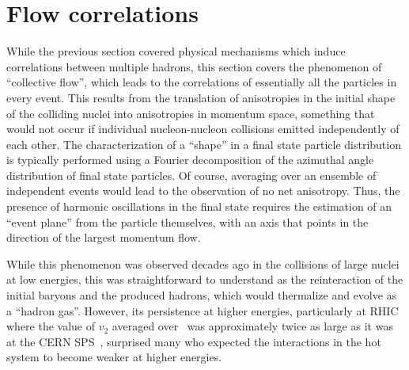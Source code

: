 \section{Flow correlations}
\label{sec:ps:flow}


While the previous section covered physical mechanisms which induce
correlations between multiple hadrons, this section covers the
phenomenon of ``collective flow'', which leads to the correlations of
essentially all the particles in every event.
This results from the translation of anisotropies in the initial shape of the
colliding nuclei into anisotropies in momentum space, something that
would not occur if individual nucleon-nucleon collisions emitted independently
of each other.
The characterization of a ``shape'' in a final state particle distribution
is typically performed using a Fourier decomposition of the azimuthal
angle distribution of final state particles.
Of course, averaging over an ensemble of independent events would lead to
the observation of no net anisotropy.  Thus, the presence of harmonic
oscillations in the final state requires the estimation of an ``event plane''
from the particle themselves, with an axis that points in the direction of
the largest momentum flow.

While this phenomenon was observed decades ago in the collisions of large
nuclei at low energies, this was straightforward to understand as the
reinteraction of the initial baryons and the produced hadrons, which
would thermalize and evolve as a ``hadron gas''.
However, its persistence at higher energies, particularly at RHIC where the
value of $v_2$ averaged over \pT\ was approximately twice as large as it was at the
CERN SPS~\cite{Ackermann:2000tr}, surprised many who expected the interactions
in the hot system to become weaker at higher energies.


